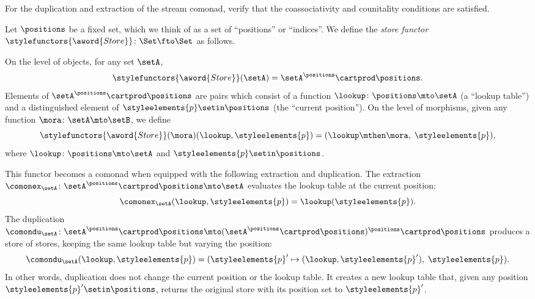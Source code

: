 \begin{gradedexercise}
For the duplication and extraction of the stream comonad, verify that the coassociativity and counitality conditions are satisfied. 
\end{gradedexercise}


\begin{example}
\label{exa:store-comonad}

Let $\positions$ be a fixed set, which we think of as a set of ``positions'' or ``indices''. We define the \emph{store functor} $\stylefunctors{\aword{Store}} \colon \Set \fto \Set$ as follows.

On the level of objects, for any set $\setA$,
\begin{equation}
    \stylefunctors{\aword{Store}}(\setA) = \setA^{\positions} \cartprod \positions.
\end{equation}
Elements of $\setA^{\positions} \cartprod \positions$ are pairs which consist of a function $\lookup \colon \positions \mto \setA$ (a ``lookup table'') and a distinguished element of $\styleelements{p} \setin \positions$ (the ``current position''). On the level of morphisms, given any function $\mora \colon \setA \mto \setB$, we define
\begin{equation}
    \stylefunctors{\aword{Store}}(\mora)(\lookup, \styleelements{p}) = (\lookup \mthen \mora,\; \styleelements{p}),
\end{equation}
where $\lookup \colon \positions \mto \setA$ and $\styleelements{p} \setin \positions$.

This functor becomes a comonad when equipped with the following extraction and duplication. The extraction $\comonex_\setA \colon \setA^{\positions} \cartprod \positions \mto \setA$ evaluates the lookup table at the current position:
\begin{equation}\label{eq:store-comonad-extraction}
    \comonex_\setA(\lookup, \styleelements{p}) = \lookup(\styleelements{p}).
\end{equation}
The duplication $\comondu_\setA \colon \setA^{\positions} \cartprod \positions \mto (\setA^{\positions} \cartprod \positions)^{\positions} \cartprod \positions$ produces a store of stores, keeping the same lookup table but varying the position:
\begin{equation}\label{eq:store-comonad-duplication}
    \comondu_\setA(\lookup, \styleelements{p}) = (\styleelements{p}' \mapsto (\lookup, \styleelements{p}'),\; \styleelements{p}).
\end{equation}
In other words, duplication does not change the current position or the lookup table. It creates a new lookup table that, given any position $\styleelements{p}' \setin \positions$, returns the original store with its position set to $\styleelements{p}'$.
\end{example}


